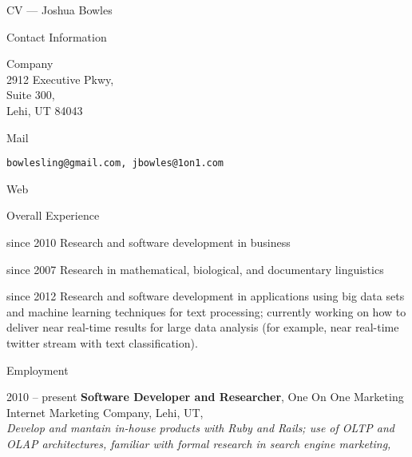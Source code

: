 \begin{cv}{CV --- Joshua Bowles}
\hfill
   
\begin{cvlist}{Contact Information}
	\item[Company] \\
				2912 Executive Pkwy,\\
				Suite 300,\\ 
				Lehi, UT 84043
\item[Mail]     \begin{verbatim}bowlesling@gmail.com, jbowles@1on1.com\end{verbatim}
\item[Web]			 
\end{cvlist}

\begin{cvlist}{Overall Experience}
\item[since 2010] Research and software development in business
\item[since 2007] Research in mathematical, biological, and documentary linguistics
\item[since 2012] Research and software development in applications using big data sets and machine learning techniques for text processing; currently working on how to deliver near real-time results for large data analysis (for example, near real-time twitter stream with text classification).
\end{cvlist}

\begin{cvlist}{Employment}
\item[2010 -- present] {\bf Software Developer and Researcher}, One On One Marketing\\
			Internet Marketing Company, Lehi, UT,\\
			\textsl{Develop and mantain in-house products with Ruby and Rails; use of OLTP and OLAP architectures, familiar with formal research in search engine marketing,}
	

\end{cvlist}
\end{cv}

